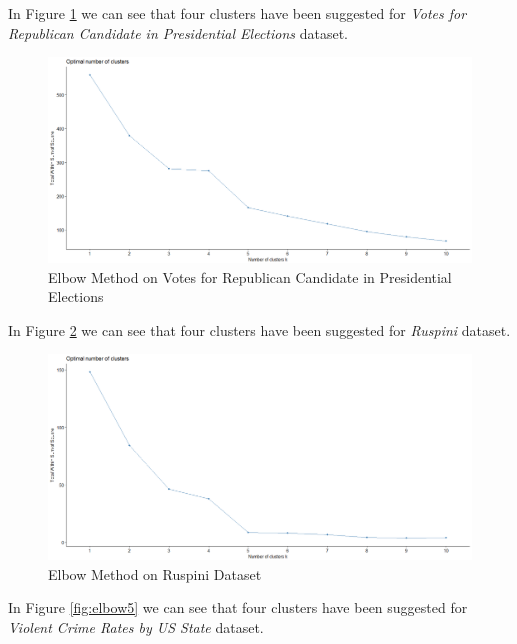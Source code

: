\begin{itemize}
\newpage

In Figure \ref{fig:elbow3} we can see that four clusters have been suggested for \textit{Votes for Republican Candidate in Presidential Elections}
dataset.

\begin{figure}[h!]
  \centering
  \includegraphics[scale=1.3]{figures/results/republican/elbow.png}
  \caption{Elbow Method on Votes for Republican Candidate in Presidential Elections}
  \label{fig:elbow3}
\end{figure}

\vspace{15mm}

In Figure \ref{fig:elbow4} we can see that four clusters have been suggested for \textit{Ruspini} dataset.

\begin{figure}[h!]
  \centering
  \includegraphics[scale=1.3]{figures/results/ruspini/elbow.png}
  \caption{Elbow Method on Ruspini Dataset}
  \label{fig:elbow4}
\end{figure}

\newpage

In Figure \ref{fig:elbow5} we can see that four clusters have been suggested for \textit{Violent Crime Rates by US State}
dataset.


\end{itemize}
